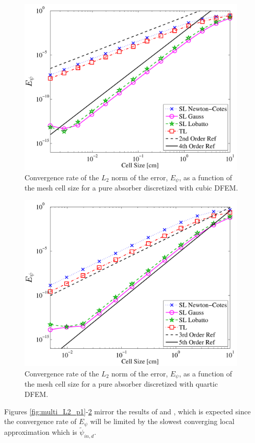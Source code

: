\begin{figure}[!hbp]
\centering
\includegraphics[width=11cm]{chapter2_constant_xs/Cubic_L2_err-eps-converted-to.pdf}
\caption{Convergence rate of the $L_2$ norm of the error, $E_{\psi}$,  as a function of the mesh cell size for a pure absorber discretized with cubic DFEM.}
\label{fig:multi_L2_p3}
\end{figure}
\begin{figure}[!htp]
\centering
\includegraphics[width=11cm]{chapter2_constant_xs/Quartic_L2_err-eps-converted-to.pdf}
\caption{Convergence rate of the $L_2$ norm of the error, $E_{\psi}$,  as a function of the mesh cell size for a pure absorber discretized with quartic DFEM.}
\label{fig:multi_L2_p4}
\end{figure}
Figures \ref{fig:multi_L2_p1}-\ref{fig:multi_L2_p4} mirror the results of  and , which is expected since the convergence rate of $E_{\psi}$ will be limited by the slowest converging local approximation which is $\widetilde{\psi}_{in,d}$.  
